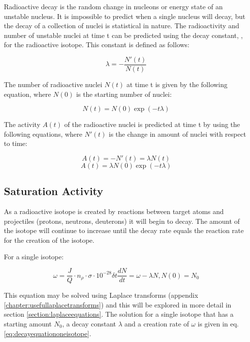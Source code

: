 Radioactive decay is the random change in nucleons or energy state of an unstable nucleus.  It is impossible to predict when a single nucleus will decay, but the decay of a collection of nuclei is statistical in nature.  The radioactivity and number of unstable nuclei at time t can be predicted using the decay constant, \textlambda, for the radioactive isotope.  This constant is defined as follows:

\begin{equation}
\lambda = - \frac{N'(t)}{N(t)}
\end{equation}

The number of radioactive nuclei $N(t)$ at time t is given by the following equation, where $N(0)$ is the starting number of nuclei:

\begin{equation}
N(t) = N(0) \exp(-t \lambda)
\end{equation}

The activity $A(t)$ of the radioactive nuclei is predicted at time t by using the following equations, where $N'(t)$ is the change in amount of nuclei with respect to time:

\begin{equation}
A(t) = -N'(t) = \lambda N(t)
\label{eq:activityofanisotope}
\end{equation}
\begin{equation}
A(t) = \lambda N(0) \exp(-t \lambda)
\end{equation}

\subsection{Saturation Activity}

As a radioactive isotope is created by reactions between target atoms and projectiles (protons, neutrons, deuterons) it will begin to decay.  The amount of the isotope will continue to increase until the decay rate equals the reaction rate for the creation of the isotope.

For a single isotope:

\begin{equation}
\omega = \frac{J}{Q} \cdot n_{\rho} \cdot \sigma \cdot 10^{-28} \delta t
\frac{dN}{dt} = \omega - \lambda N, N(0) = N_0
\end{equation}

This equation may be solved using Laplace transforms (appendix \ref{chapter:usefullaplacetransforms}) and this will be explored in more detail in section \ref{section:laplaceequations}.  The solution for a single isotope that has a starting amount $N_0$, a decay constant $\lambda$ and a creation rate of $\omega$ is given in eq. \ref{eq:decayequationoneisotope}.

